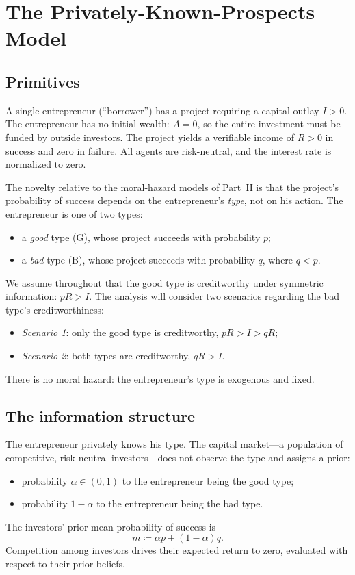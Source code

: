 \documentclass[11pt,a4paper,oneside]{book}
\theoremstyle{plain}
\theoremstyle{definition}
\theoremstyle{remark}
\numberwithin{equation}{chapter}
\begin{document}
\section{The Privately-Known-Prospects Model}
\label{sec:lemons-model}

\subsection{Primitives}

A single entrepreneur (``borrower'') has a project requiring a capital outlay $I > 0$.
The entrepreneur has no initial wealth: $A = 0$, so the entire investment must be funded by outside investors.
The project yields a verifiable income of $R > 0$ in success and zero in failure.
All agents are risk-neutral, and the interest rate is normalized to zero.

The novelty relative to the moral-hazard models of Part~II is that the project's probability of success depends on the entrepreneur's \emph{type}, not on his action.
The entrepreneur is one of two types:
\begin{itemize}
  \item a \emph{good} type (G), whose project succeeds with probability $p$;
  \item a \emph{bad} type (B), whose project succeeds with probability $q$, where $q < p$.
\end{itemize}
We assume throughout that the good type is creditworthy under symmetric information: $pR > I$.
The analysis will consider two scenarios regarding the bad type's creditworthiness:
\begin{itemize}
  \item \emph{Scenario 1}: only the good type is creditworthy, $pR > I > qR$;
  \item \emph{Scenario 2}: both types are creditworthy, $qR > I$.
\end{itemize}
There is no moral hazard: the entrepreneur's type is exogenous and fixed.

\subsection{The information structure}

The entrepreneur privately knows his type.
The capital market---a population of competitive, risk-neutral investors---does not observe the type and assigns a prior:
\begin{itemize}
  \item probability $\alpha \in (0, 1)$ to the entrepreneur being the good type;
  \item probability $1 - \alpha$ to the entrepreneur being the bad type.
\end{itemize}
The investors' prior mean probability of success is
\begin{equation}\label{eq:lemons-m}
  m \coloneqq \alpha p + (1 - \alpha) q.
\end{equation}
Competition among investors drives their expected return to zero, evaluated with respect to their prior beliefs.
\end{document}
